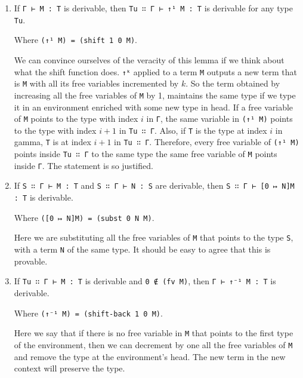 \documentclass{article}
\begin{document}
\begin{enumerate}
    \item
    \begin{wek}
    If \textnormal{\texttt{Γ ⊢ M : T}} is derivable, then \textnormal{\texttt{Tu ∷ Γ ⊢ ↑¹ M : T}} is derivable for any type \textnormal{\texttt{Tu}}.
    \end{wek}
    
    Where \texttt{(↑¹ M) = (shift 1 0 M)}.
    
    We can convince ourselves of the veracity of this lemma if we think about what the shift function does.
    \texttt{↑ᵏ} applied to a term \texttt{M} outputs a new term that is \texttt{M} with all its free variables incremented by $k$.
    So the term obtained by increasing all the free variables of \texttt{M} by 1, maintains the same type if we type it in an environment enriched with some new type in head.
    If a free variable of \texttt{M} points to the type with index $i$ in \texttt{Γ}, the same variable in \texttt{(↑¹ M)} points to the type with index $i+1$ in \texttt{Tu ∷ Γ}.
    Also, if \texttt{T} is the type at index $i$ in gamma, \texttt{T} is at index $i+1$ in \texttt{Tu ∷ Γ}.
    Therefore, every free variable of \texttt{(↑¹ M)} points inside \texttt{Tu ∷ Γ} to the same type the same free variable of \texttt{M} points inside \texttt{Γ}.
    The statement is so justified.

    \item
    \begin{sub}
    If \textnormal{\texttt{S ∷ Γ ⊢ M : T}} and \textnormal{\texttt{S ∷ Γ ⊢ N : S}} are derivable, then \textnormal{\texttt{S ∷ Γ ⊢ [0 ↦ N]M : T}} is derivable.
    \end{sub}
    
    Where \texttt{([0 ↦ N]M) = (subst 0 N M)}.
    
    Here we are substituting all the free variables of \texttt{M} that points to the type \texttt{S}, with a term \texttt{N} of the same type.
    It should be easy to agree that this is provable.
    
    \item
    \begin{str}
    If \textnormal{\texttt{Tu ∷ Γ ⊢ M : T}} is derivable and \textnormal{\texttt{0 ∉ (fv M)}}, then \textnormal{\texttt{Γ ⊢ ↑⁻¹ M : T}} is derivable.
    \end{str}
    
    Where \texttt{(↑⁻¹ M) = (shift-back 1 0 M)}.
    
    Here we say that if there is no free variable in \texttt{M} that points to the first type of the environment, then we can decrement by one all the free variables of \texttt{M} and remove the type at the environment's head.
    The new term in the new context will preserve the type.
\end{enumerate}
\end{document}
